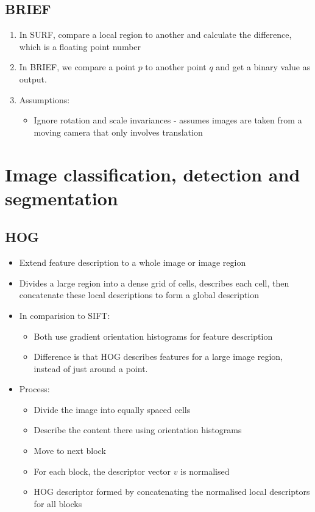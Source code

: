 \documentclass[9pt]{article}
\begin{document}
\begin{multicols*}{2}
        \subsection{BRIEF}
        \begin{enumerate}
            \item In SURF, compare a local region to another and calculate the difference, which is a floating point number
            \item In BRIEF, we compare a point $p$ to another point $q$ and get a binary value as output.
            \item Assumptions:
            \begin{itemize}
                \item Ignore rotation and scale invariances - assumes images are taken from a moving camera that only involves translation
            \end{itemize}
        \end{enumerate}


    \section{Image classification, detection and segmentation}
    \subsection{HOG}
    \begin{itemize}
        \item Extend feature description to a whole image or image region 
        \item Divides a large region into a dense grid of cells, describes each cell, then concatenate these local descriptions to form a 
        global description
        \item In comparision to SIFT:
        \begin{itemize}
            \item Both use gradient orientation histograms for feature description
            \item Difference is that HOG describes features for a large image region, instead of just around a point.
        \end{itemize}
        \item Process:
        \begin{itemize}
            \item Divide the image into equally spaced cells
            \item Describe the content there using orientation histograms
            \item Move to next block
            \item For each block, the descriptor vector $v$ is normalised 
            \item HOG descriptor formed by concatenating the normalised local descriptors for all blocks 
        \end{itemize}
    \end{itemize}


\end{multicols*}
\end{document}
